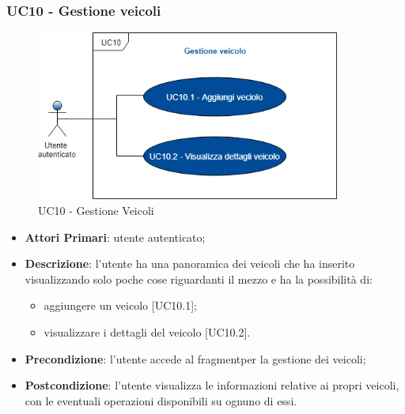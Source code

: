  \subsubsection{UC10 - Gestione veicoli}
  \begin{figure}[H]
 	\includegraphics[width=10cm]{res/images/UC10Gestioneveicolo.png}
 	\centering
 	\caption{UC10 - Gestione Veicoli}
 \end{figure}
 \begin{itemize}
 	\item \textbf{Attori Primari}: utente autenticato;
 	\item \textbf{Descrizione}: l'utente ha una panoramica dei veicoli che ha inserito visualizzando solo poche cose riguardanti il mezzo e ha la possibilità di:
 	\begin{itemize}
 		\item aggiungere un veicolo [UC10.1];
 		\item visualizzare i dettagli del veicolo [UC10.2].
 	\end{itemize}
 	\item \textbf{Precondizione}: l'utente accede al fragment\glosp per la gestione dei veicoli;
 	\item \textbf{Postcondizione}: l'utente visualizza le informazioni relative ai propri veicoli, con le eventuali operazioni disponibili su ognuno di essi.
 \end{itemize}
